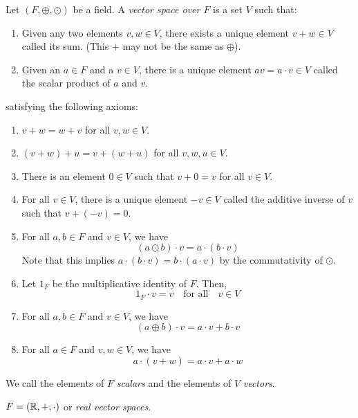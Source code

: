 \begin{defn}[] \label{defn:vector_space}
    Let $(F, \oplus, \odot)$ be a field. A \emph{vector space over $F$} is a set $V$ such that:
    \begin{enumerate}[label=(\alph*)]
        \item Given any two elements $v, w \in V$, there exists a unique element $v + w \in V$ called its sum.
        (This $+$ may not be the same as $\oplus$).
        \item Given an $a \in F$ and a $v \in V$, there is a unique element $av = a \cdot v \in V$ called the scalar product of $a$ and $v$.
    \end{enumerate}
    satisfying the following axioms:
    \begin{enumerate}[label=(V\arabic*)]
        \item $v + w = w + v$ for all $v, w \in V$.
        \item $(v + w) + u = v + (w + u)$ for all $v, w, u \in V$.
        \item There is an element $0 \in V$ such that $v + 0 = v$ for all $v \in V$.
        \item For all $v \in V$, there is a unique element $-v \in V$ called the additive inverse of $v$ such that $v + (-v) = 0$.
        \item For all $a, b \in F$ and $v \in V$, we have \[
            (a \odot b) \cdot v = a \cdot (b \cdot v)
        \] Note that this implies $a \cdot (b \cdot v) = b \cdot (a \cdot v)$ by the commutativity of $\odot$.
        \item Let $1_{F}$ be the multiplicative identity of $F$. Then, \[
            1_{F} \cdot v = v \quad\text{for all}\quad v \in V
        \]
        \item For all $a, b \in F$ and $v \in V$, we have \[
            (a \oplus b) \cdot v = a \cdot v + b \cdot v
        \]
        \item For all $a \in F$ and $v, w \in V$, we have \[
            a \cdot (v + w) = a \cdot v + a \cdot w
        \]
    \end{enumerate}
    We call the elements of $F$ \emph{scalars} and the elements of $V$ \emph{vectors}.
\end{defn}
\begin{example}
    $F = (\mathbb{R}, +, \cdot)$ or \emph{real vector spaces}.
\end{example}

